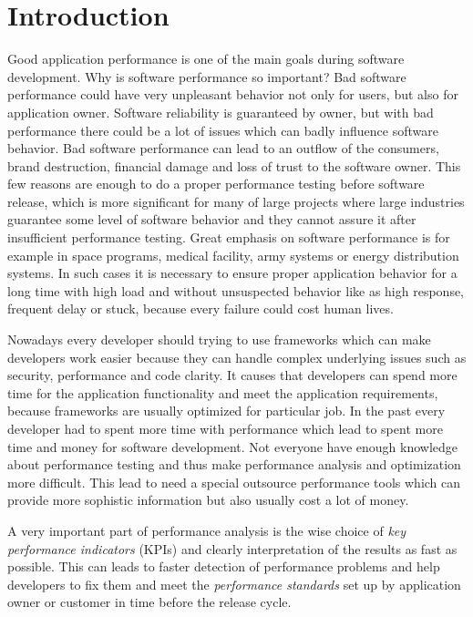 

\chapter{Introduction}
Good application performance is one of the main goals during software development. Why is software performance so important? Bad software performance could have very unpleasant behavior not only for users, but also for application owner. Software reliability is guaranteed by owner, but with bad performance there could be a lot of issues which can badly influence software behavior. Bad software performance can lead to an outflow of the consumers, brand destruction, financial damage and loss of trust to the software owner. This few reasons are enough to do a proper performance testing before software release, which is more significant for many of large projects where large industries guarantee some level of software behavior and they cannot assure it after insufficient performance testing. Great emphasis on software performance is for example in space programs, medical facility, army systems or energy distribution systems. In such cases it is necessary to ensure proper application behavior for a long time with high load and without unsuspected behavior like as high response, frequent delay or stuck, because every failure could cost human lives. 

Nowadays every developer should trying to use frameworks which can make developers work easier because they can handle complex underlying issues such as security, performance and code clarity. It causes that developers can spend more time for the application functionality and meet the application requirements, because frameworks are usually optimized for particular job. In the past every developer had to spent more time with performance which lead to spent more time and money for software development. Not everyone have enough knowledge about performance testing and thus make performance analysis and optimization more difficult. This lead to need a special outsource performance tools which can provide more sophistic information but also usually cost a lot of money.

A very important part of performance analysis is the wise choice of \emph{key performance indicators} (KPIs)\cite{Molyneaux:TAoAPT} and clearly interpretation of the results as fast as possible. This can leads to faster detection of performance problems and help developers to fix them and meet the \emph{performance standards}\cite{Molyneaux:TAoAPT} set up by application owner or customer in time before the release cycle. 

